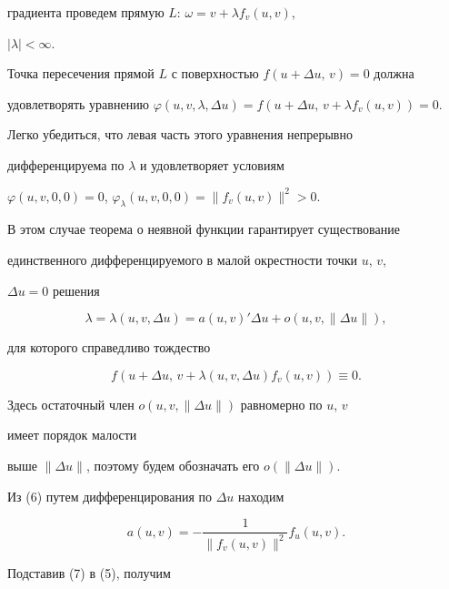 градиента проведем прямую $L$: $\omega=v+\lambda f_v(u,v)$, 


$|\lambda|<\infty$.


Точка пересечения прямой $L$ с поверхностью $f(u+\Delta u,\,v)=0$ должна 


удовлетворять уравнению $\varphi(u,v,\lambda,\Delta u)=f(u+\Delta 


u,\,v+\lambda f_v(u,v))=0$.


Легко убедиться, что левая часть этого уравнения непрерывно


дифференцируема по $\lambda$ и удовлетворяет условиям 


$\varphi(u,v,0,0)=0$, $\varphi_\lambda(u,v,0,0)=\|f_v(u,v)\|^2>0$.


В этом случае теорема о неявной функции гарантирует существование 


единственного дифференцируемого в малой окрестности точки $u$, $v$, 


$\Delta u=0$ решения


\begin{equation}


\lambda=\lambda(u,v,\Delta u)=a(u,v)' \Delta u+


o(u,v,\|\Delta u\|),


\end{equation}


для которого справедливо тождество


\begin{equation}


f(u+\Delta u,\,v+\lambda(u,v,\Delta u)


f_v(u,v))\equiv0.


\end{equation}


Здесь остаточный член $o(u,v,\|\Delta u\|)$ равномерно по $u$, $v$ 


имеет порядок малости


выше $\|\Delta u\|$, поэтому будем обозначать его $o(\|\Delta u\|)$.





Из (6) путем дифференцирования по $\Delta u$ находим


\begin{equation}


a(u,v)=-\frac{1}{\|f_v(u,v)\|^2}f_u(u,v).


\end{equation}


Подставив (7) в (5), получим


